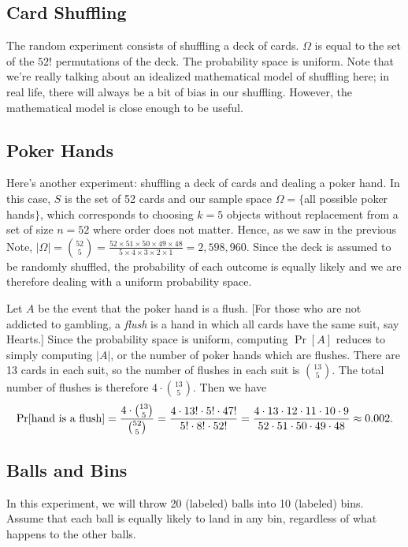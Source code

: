 \documentclass[11pt,fleqn]{article}
\begin{document}
\subsection*{Card Shuffling}
The random experiment consists of shuffling a deck of cards. $\Omega$ is equal to 
the set of the $52!$
permutations of the deck. The probability space is uniform.  
Note that we're really talking about an idealized mathematical
model of shuffling here; in real life, there will always be a bit of
bias in our shuffling.  However, the mathematical model is close enough
to be useful.

\subsection*{Poker Hands}
Here's another experiment: shuffling a deck of cards and dealing a poker hand.  In this case, $S$
is the set of 52 cards and 
our sample space $\Omega = \{$all possible poker hands$\}$, which corresponds
to choosing $k=5$ objects without replacement from a set of size $n=52$
where order does not matter.  Hence, as we saw in the previous Note,
$|\Omega| = {52 \choose 5} = \frac{52 \times 51 \times 50 \times 49 \times 48}{5 \times 4 \times 3 \times 2 \times 1} = 2,598,960$.
Since the deck is assumed to be randomly shuffled, the probability of each outcome is equally likely
and we are therefore dealing with a uniform probability space. 

Let $A$ be the event that the poker hand is a flush. 
[For those who are not addicted to gambling, a {\it flush\/}
is a hand in which all cards have the same suit, say Hearts.]
Since the probability space is uniform, computing $\Pr[A]$ reduces
to simply computing $|A|$, or the number of poker hands which are flushes.
There are 13 cards in
each suit, so the number of flushes in each suit is
${13}\choose 5$.  The total number of flushes is therefore
$4\cdot{{13}\choose 5}$.  Then we have  $$
               \Pr[\hbox{\rm hand is a flush}] =
                    {{4\cdot{{13}\choose 5}}\over{{{52}\choose 5}}} =
                    {{4\cdot{13!}\cdot 5!\cdot{47!}}\over{5!\cdot 8!\cdot{52!}}} =
                    {{4\cdot 13\cdot 12\cdot 11\cdot 10\cdot 9}\over
                                {52\cdot 51\cdot 50\cdot 49\cdot 48}}\approx
                    0.002.  $$

\subsection*{Balls and Bins}
In this experiment, we will throw 20 (labeled) balls into 10 (labeled) bins.
Assume that each ball is equally likely to land in any bin, regardless of what happens to
the other balls. 
\end{document}
